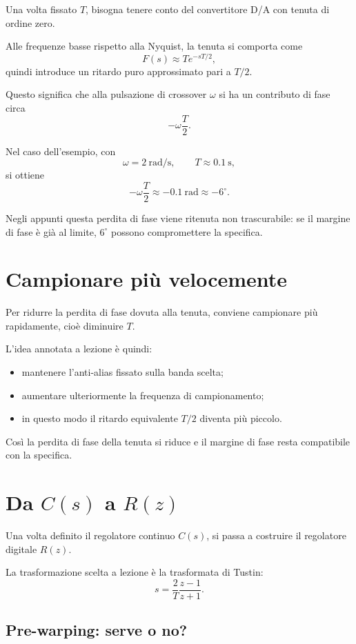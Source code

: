 Una volta fissato \(T\), bisogna tenere conto del convertitore D/A con tenuta di ordine zero.

Alle frequenze basse rispetto alla Nyquist, la tenuta si comporta come
\[
F(s)\approx T e^{-sT/2},
\]
quindi introduce un ritardo puro approssimato pari a \(T/2\).

Questo significa che alla pulsazione di crossover \(\omega\) si ha un contributo di fase circa
\[
-\omega \frac{T}{2}.
\]

Nel caso dell'esempio, con
\[
\omega=2\ \text{rad/s},
\qquad
T\approx 0.1\ \text{s},
\]
si ottiene
\[
-\omega\frac{T}{2}\approx -0.1\ \text{rad}\approx -6^\circ.
\]

Negli appunti questa perdita di fase viene ritenuta non trascurabile:
se il margine di fase \`e gi\`a al limite, \(6^\circ\) possono compromettere la specifica.

\section{Campionare pi\`u velocemente}

Per ridurre la perdita di fase dovuta alla tenuta, conviene campionare pi\`u rapidamente,
cio\`e diminuire \(T\).

L'idea annotata a lezione \`e quindi:
\begin{itemize}
    \item mantenere l'anti-alias fissato sulla banda scelta;
    \item aumentare ulteriormente la frequenza di campionamento;
    \item in questo modo il ritardo equivalente \(T/2\) diventa pi\`u piccolo.
\end{itemize}

Cos\`i la perdita di fase della tenuta si riduce e il margine di fase resta compatibile con la specifica.

\section{Da \(C(s)\) a \(R(z)\)}

Una volta definito il regolatore continuo \(C(s)\), si passa a costruire il regolatore digitale \(R(z)\).

La trasformazione scelta a lezione \`e la trasformata di Tustin:
\[
s=\frac{2}{T}\frac{z-1}{z+1}.
\]

\subsection{Pre-warping: serve o no?}

